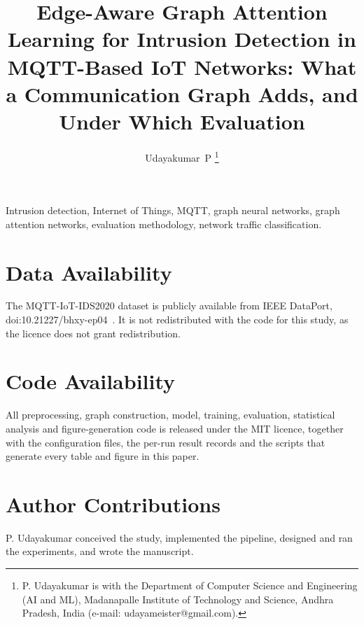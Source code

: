 \documentclass[journal]{IEEEtran}
\begin{document}
\title{Edge-Aware Graph Attention Learning for Intrusion Detection in
MQTT-Based IoT Networks: What a Communication Graph Adds, and Under Which
Evaluation}

\author{Udayakumar~P%
\thanks{P. Udayakumar is with the Department of Computer Science and
Engineering (AI and ML), Madanapalle Institute of Technology and Science,
Andhra Pradesh, India (e-mail: udayameister@gmail.com).}}


\maketitle

\begin{abstract}
\end{abstract}

\begin{IEEEkeywords}
Intrusion detection, Internet of Things, MQTT, graph neural networks, graph
attention networks, evaluation methodology, network traffic classification.
\end{IEEEkeywords}











\section*{Data Availability}
The MQTT-IoT-IDS2020 dataset is publicly available from IEEE DataPort,
doi:10.21227/bhxy-ep04~\cite{hindy2020mqttdataset}. It is not redistributed
with the code for this study, as the licence does not grant redistribution.

\section*{Code Availability}
All preprocessing, graph construction, model, training, evaluation, statistical
analysis and figure-generation code is released under the MIT licence, together
with the configuration files, the per-run result records and the scripts that
generate every table and figure in this paper.

\section*{Author Contributions}
P. Udayakumar conceived the study, implemented the pipeline, designed and ran
the experiments, and wrote the manuscript.
\end{document}

